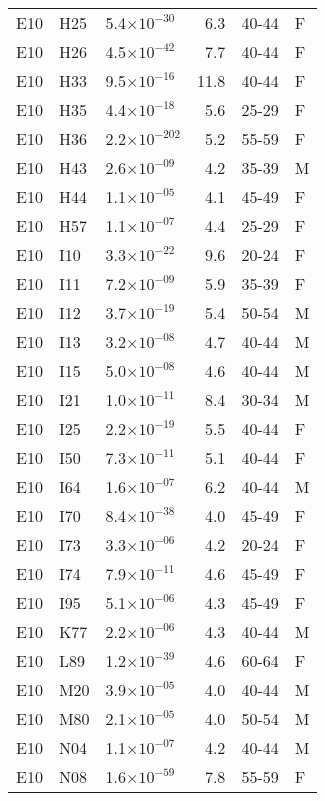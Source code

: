 \begin{longtable}{lllrll}
   E10 & H25 & 5.4$\times10^{-30}$ & 6.3 & 40-44 & F \\ 
   E10 & H26 & 4.5$\times10^{-42}$ & 7.7 & 40-44 & F \\ 
   E10 & H33 & 9.5$\times10^{-16}$ & 11.8 & 40-44 & F \\ 
   E10 & H35 & 4.4$\times10^{-18}$ & 5.6 & 25-29 & F \\ 
   E10 & H36 & 2.2$\times10^{-202}$ & 5.2 & 55-59 & F \\ 
   E10 & H43 & 2.6$\times10^{-09}$ & 4.2 & 35-39 & M \\ 
   E10 & H44 & 1.1$\times10^{-05}$ & 4.1 & 45-49 & F \\ 
   E10 & H57 & 1.1$\times10^{-07}$ & 4.4 & 25-29 & F \\ 
   E10 & I10 & 3.3$\times10^{-22}$ & 9.6 & 20-24 & F \\ 
   E10 & I11 & 7.2$\times10^{-09}$ & 5.9 & 35-39 & F \\ 
   E10 & I12 & 3.7$\times10^{-19}$ & 5.4 & 50-54 & M \\ 
   E10 & I13 & 3.2$\times10^{-08}$ & 4.7 & 40-44 & M \\ 
   E10 & I15 & 5.0$\times10^{-08}$ & 4.6 & 40-44 & M \\ 
   E10 & I21 & 1.0$\times10^{-11}$ & 8.4 & 30-34 & M \\ 
   E10 & I25 & 2.2$\times10^{-19}$ & 5.5 & 40-44 & F \\ 
   E10 & I50 & 7.3$\times10^{-11}$ & 5.1 & 40-44 & F \\ 
   E10 & I64 & 1.6$\times10^{-07}$ & 6.2 & 40-44 & M \\ 
   E10 & I70 & 8.4$\times10^{-38}$ & 4.0 & 45-49 & F \\ 
   E10 & I73 & 3.3$\times10^{-06}$ & 4.2 & 20-24 & F \\ 
   E10 & I74 & 7.9$\times10^{-11}$ & 4.6 & 45-49 & F \\ 
   E10 & I95 & 5.1$\times10^{-06}$ & 4.3 & 45-49 & F \\ 
   E10 & K77 & 2.2$\times10^{-06}$ & 4.3 & 40-44 & M \\ 
   E10 & L89 & 1.2$\times10^{-39}$ & 4.6 & 60-64 & F \\ 
   E10 & M20 & 3.9$\times10^{-05}$ & 4.0 & 40-44 & M \\ 
   E10 & M80 & 2.1$\times10^{-05}$ & 4.0 & 50-54 & M \\ 
   E10 & N04 & 1.1$\times10^{-07}$ & 4.2 & 40-44 & M \\ 
   E10 & N08 & 1.6$\times10^{-59}$ & 7.8 & 55-59 & F \\ 

\end{longtable}
